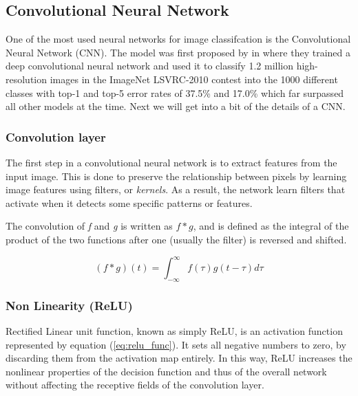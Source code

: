 \documentclass[thesis.tex]{subfiles}
\begin{document}
\subsection{Convolutional Neural Network} \label{convolutional_neural_network}
One of the most used neural networks for image classifcation is the Convolutional Neural Network (CNN). The model was first proposed by \citeauthor*{ImageNetClassification12} in \citeyear{ImageNetClassification12} \cite{ImageNetClassification12} where they trained a deep convolutional neural network and used it to classify 1.2 million high-resolution images in the ImageNet LSVRC-2010 contest into the 1000 different classes with top-1 and top-5 error rates of 37.5\% and 17.0\% which far surpassed all other models at the time. Next we will get into a bit of the details of a CNN.


\subsubsection{Convolution layer}
The first step in a convolutional neural network is to extract features from the input image. This is done to preserve the relationship between pixels by learning image features using filters, or \textit{kernels}. As a result, the network learn filters that activate when it detects some specific patterns or features.

The convolution of \textit{f} and \textit{g} is written as $f*g$, and is defined as the integral of the product of the two functions after one (usually the filter) is reversed and shifted.

\begin{equation} %
  (f*g)(t) = \int_{-\infty}^{\infty} f(\tau) g(t-\tau) d\tau
  \label{eq:convolution_func}
\end{equation}


\subsubsection{Non Linearity (ReLU)}
Rectified Linear unit function, known as simply ReLU, is an activation function represented by equation (\ref{eq:relu_func}). It sets all negative numbers to zero, by discarding them from the activation map entirely. In this way, ReLU increases the nonlinear properties of the decision function and thus of the overall network without affecting the receptive fields of the convolution layer.
\end{document}
